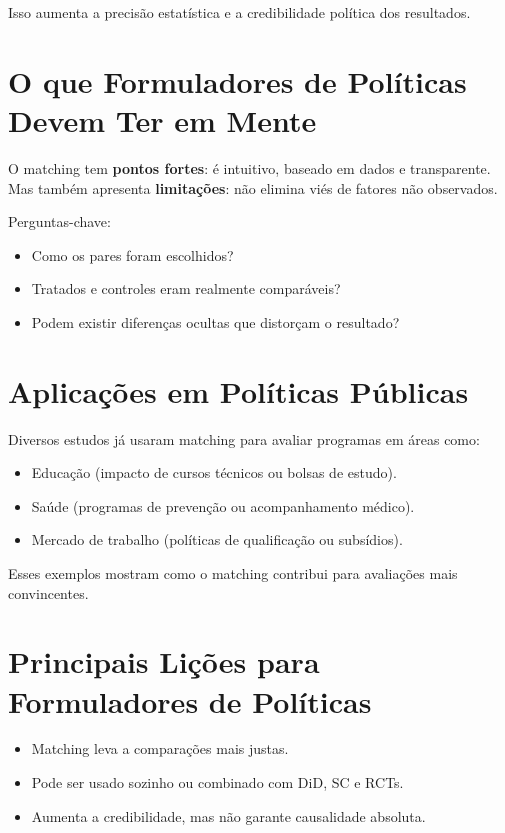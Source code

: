 \documentclass[12pt]{article}
\begin{document}
Isso aumenta a precisão estatística e a credibilidade política dos resultados.

\section{O que Formuladores de Políticas Devem Ter em Mente}
O matching tem \textbf{pontos fortes}: é intuitivo, baseado em dados e transparente.  
Mas também apresenta \textbf{limitações}: não elimina viés de fatores não observados.  

Perguntas-chave:
\begin{itemize}[topsep=2pt,itemsep=2pt]
    \item Como os pares foram escolhidos?
    \item Tratados e controles eram realmente comparáveis?
    \item Podem existir diferenças ocultas que distorçam o resultado?
\end{itemize}

\section{Aplicações em Políticas Públicas}
Diversos estudos já usaram matching para avaliar programas em áreas como:
\begin{itemize}[topsep=2pt,itemsep=2pt]
    \item Educação (impacto de cursos técnicos ou bolsas de estudo).
    \item Saúde (programas de prevenção ou acompanhamento médico).
    \item Mercado de trabalho (políticas de qualificação ou subsídios).
\end{itemize}

Esses exemplos mostram como o matching contribui para avaliações mais convincentes.

\section{Principais Lições para Formuladores de Políticas}
\begin{itemize}[topsep=2pt,itemsep=2pt]
    \item Matching leva a comparações mais justas.
    \item Pode ser usado sozinho ou combinado com DiD, SC e RCTs.
    \item Aumenta a credibilidade, mas não garante causalidade absoluta.
\end{itemize}
\end{document}
